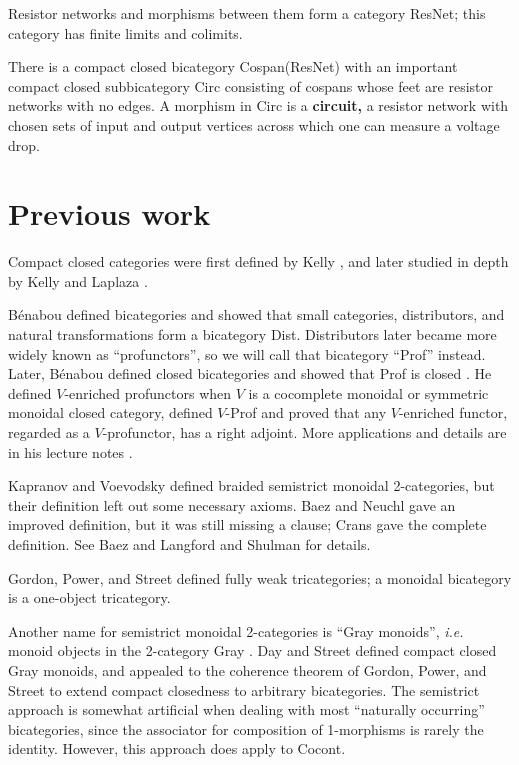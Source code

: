 \documentclass[12pt,twoside,openright]{report}
\begin{document}
\begin{itemize}
    Resistor networks and morphisms between them form a category ResNet;
this category has finite limits and colimits.
    
    There is a compact closed bicategory Cospan(ResNet) with an important compact closed subbicategory Circ consisting of cospans whose feet are resistor networks with no edges.  A morphism in Circ is a {\bf circuit,} a resistor network with chosen sets of input and output vertices across which one can measure a voltage drop.
\end{itemize}

\section{Previous work}
\label{previous}

Compact closed categories were first defined by Kelly \cite{KellyCC}, and later studied in depth by Kelly and Laplaza \cite{KellyLaplaza}.

B\'enabou \cite{Ben67} defined bicategories and showed that small categories, distributors, and natural transformations form a bicategory Dist.  Distributors later became more widely known as ``profunctors'', so we will call that bicategory ``Prof'' instead.  Later, B\'enabou defined closed bicategories and showed that Prof is closed  \cite
{Ben73}.  He defined $V$-enriched profunctors when $V$ is a cocomplete monoidal or symmetric monoidal closed category, defined $V$-Prof and proved that any $V$-enriched functor, regarded as a $V$-profunctor, has a right adjoint.  More applications and details are in his lecture notes
\cite{Ben00}.

Kapranov and Voevodsky \cite{KV94} defined braided semistrict monoidal
2-categories, but their definition left out some necessary axioms.  Baez and Neuchl \cite{HDA1} gave an improved definition, but it was still missing a clause; Crans \cite{Crans} gave the complete definition.  See Baez and Langford \cite{HDA4} and Shulman \cite{Shulman} for details.

Gordon, Power, and Street \cite{GPS} defined fully weak tricategories; a monoidal bicategory is a one-object tricategory.

Another name for semistrict monoidal 2-categories is ``Gray monoids'', 
{\em i.e.} monoid objects in the 2-category Gray \cite{Gray}.  Day and Street \cite{DS97} defined compact closed Gray monoids, and appealed to the coherence theorem of Gordon, Power, and Street to extend compact closedness to arbitrary bicategories.  The semistrict approach is somewhat artificial when dealing with most ``naturally occurring''
bicategories, since the associator for composition of 1-morphisms is rarely the identity.  However, this approach does apply to Cocont.
\end{document}
